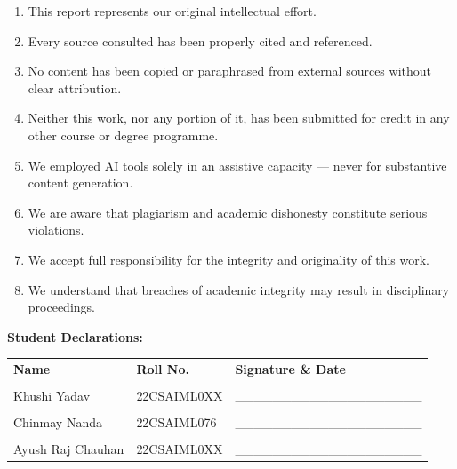 \begin{enumerate}
    \item This report represents our original intellectual effort.
    
    \item Every source consulted has been properly cited and referenced.
    
    \item No content has been copied or paraphrased from external sources without clear attribution.
    
    \item Neither this work, nor any portion of it, has been submitted for credit in any other course or degree programme.
    
    \item We employed AI tools solely in an assistive capacity — never for substantive content generation.
    
    \item We are aware that plagiarism and academic dishonesty constitute serious violations.
    
    \item We accept full responsibility for the integrity and originality of this work.
    
    \item We understand that breaches of academic integrity may result in disciplinary proceedings.
\end{enumerate}

\vspace{2cm}

\textbf{Student Declarations:}

\vspace{1cm}

\begin{tabular}{lll}
\textbf{Name} & \textbf{Roll No.} & \textbf{Signature \& Date} \\
\\
Khushi Yadav & 22CSAIML0XX & \_\_\_\_\_\_\_\_\_\_\_\_\_\_\_\_\_\_\_\_ \\
\\
Chinmay Nanda & 22CSAIML076 & \_\_\_\_\_\_\_\_\_\_\_\_\_\_\_\_\_\_\_\_ \\
\\
Ayush Raj Chauhan & 22CSAIML0XX & \_\_\_\_\_\_\_\_\_\_\_\_\_\_\_\_\_\_\_\_ \\
\end{tabular}

\vspace{2cm}

